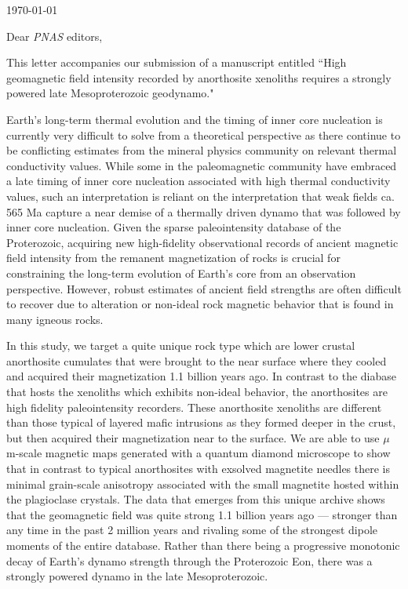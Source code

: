 \documentclass[11pt, letterpaper]{article}
\begin{document}
\begin{flushleft}
 
\hfill \today

Dear \textit{PNAS} editors,

This letter accompanies our submission of a manuscript entitled ``High geomagnetic field intensity recorded by anorthosite xenoliths requires a strongly powered late Mesoproterozoic geodynamo." 

Earth's long-term thermal evolution and the timing of inner core nucleation is currently very difficult to solve from a theoretical perspective as there continue to be conflicting estimates from the mineral physics community on relevant thermal conductivity values. While some in the paleomagnetic community have embraced a late timing of inner core nucleation associated with high thermal conductivity values, such an interpretation is reliant on the interpretation that weak fields ca. 565 Ma capture a near demise of a thermally driven dynamo that was followed by inner core nucleation. Given the sparse paleointensity database of the Proterozoic, acquiring new high-fidelity observational records of ancient magnetic field intensity from the remanent magnetization of rocks is crucial for constraining the long-term evolution of Earth's core from an observation perspective. However, robust estimates of ancient field strengths are often difficult to recover due to alteration or non-ideal rock magnetic behavior that is found in many igneous rocks. 

In this study, we target a quite unique rock type which are lower crustal anorthosite cumulates that were brought to the near surface where they cooled and acquired their magnetization 1.1 billion years ago. In contrast to the diabase that hosts the xenoliths which exhibits non-ideal behavior, the anorthosites are high fidelity paleointensity recorders. These anorthosite xenoliths are different than those typical of layered mafic intrusions as they formed deeper in the crust, but then acquired their magnetization near to the surface. We are able to use $\mu$m-scale magnetic maps generated with a quantum diamond microscope to show that in contrast to typical anorthosites with exsolved magnetite needles there is minimal grain-scale anisotropy associated with the small magnetite hosted within the plagioclase crystals. The data that emerges from this unique archive shows that the geomagnetic field was quite strong 1.1 billion years ago --- stronger than any time in the past 2 million years and rivaling some of the strongest dipole moments of the entire database. Rather than there being a progressive monotonic decay of Earth's dynamo strength through the Proterozoic Eon, there was a strongly powered dynamo in the late Mesoproterozoic.


\end{flushleft}
\end{document}
